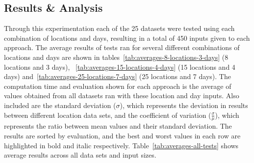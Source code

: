 \subsection{Results \& Analysis}\label{subsec:results-and-analysis}
Through this experimentation each of the 25 datasets were tested using each combination of locations and days,
resulting in a total of 450 inputs given to each approach.
The average results of tests ran for several different combinations of locations and days are shown in
tables~\ref{tab:averages-8-locations-3-days} (8 locations and 3 days),
~\ref{tab:averages-15-locations-4-days} (15 locations and 4 days)
and~\ref{tab:averages-25-locations-7-days} (25 locations and 7 days).
The computation time and evaluation shown for each approach is the average of values obtained from all datasets ran
with these location and day inputs.
Also included are the standard deviation ($\sigma$), which represents the deviation in results between different
location data sets, and the coefficient of variation ($\frac{\sigma}{\mu}$), which represents the ratio between mean
values and their standard deviation.
The results are sorted by evaluation, and the best and worst values in each row are highlighted in bold and italic
respectively.
Table~\ref{tab:averages-all-tests} shows average results across all data sets and input sizes.
